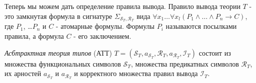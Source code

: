 \documentclass{amsart}
\theoremstyle{definition}
\theoremstyle{remark}
\numberwithin{figure}{section}
\begin{document}
Теперь мы можем дать определение правила вывода.
Правило вывода теории $T$ - это замкнутая формула в сигнатуре $\Sigma_{\mathcal{S}_T, \mathcal{R}_T}$ вида $\forall x_1 \ldots \forall x_l (P_1 \land \ldots \land P_n \to C)$, где $P_1$, \ldots $P_n$ и $C$ - атомарные формулы.
Формулы $P_i$ называются посылками правила, а формула $C$ - его заключением.

\begin{comment}
Пусть $Th$ - произвольная теория сигнатуры $\Sigma_{\mathcal{S}_T, \mathcal{R}_T}$.
Мы будем говорить, что посылка или заключение $P_i$ правила вывода $\forall x_1 \ldots \forall x_l (P_1 \land \ldots \land P_n \to P_{n+1})$ корректно в $Th$, если выполнено одно из следующих условий:
\begin{itemize}
\item $P_i = R(a_1, \ldots a_k)$ для некоторого $R \in \mathcal{R}_T$ и некоторых термов $a_1$, \ldots $a_k$.
\item $P_i = Tm_k(A_1, \ldots A_k, a, A_{k + 1})$ для некоторого $k \in \mathbb{N}$ и некоторых термов $A_1$, \ldots $A_{m + 1}$ и $a$ таких, что для любого $1 \leq j \leq m + 1$ в $Th$ выводима формула $P_1 \land \ldots \land P_{i - 1} \to Ty_{j - 1}(A_1, \ldots A_j)$.
    Кроме того, если $i \leq n$, то $a$ должен быть переменной, и если $i = n + 1$, то либо $a$ является переменной, либо $a = f(b_1, \ldots b_m)$ для некоторого $f \in \mathcal{S}_T$ такого, что $a_{\mathcal{S}_T}(f) = (s_1, \ldots s_m)$ и для всех $1 \leq j \leq m$ в $Th$ выводима либо формула $P_1 \land \ldots \land P_n \to Ty_{s_j}(d_1, \ldots d_{s_j}, b_j)$, либо формула $P_1 \land \ldots \land P_n \to Tm_{s_j}(d_1, \ldots d_{s_j}, b_j, d_{s_j + 1})$ для некоторых $d_1$, \ldots $d_{s_j + 1}$.
\item $P_i = Ty_k(A_1, \ldots A_k, a)$ для некоторого $k \in \mathbb{N}$ и некоторых термов $A_1$, \ldots $A_k$ и $a$ для которых выполнены условия из предыдущего пункта.
\end{itemize}

Мы будем говорить, что правило вывода корректно в $Th$, если все посылки и заключение корректно в $Th$.
Мы будем говорить, что множество правил вывода $\mathcal{I}$ корректно, если каждая правило вывода из $\mathcal{I}$ корректно в $Th_0 \cup \mathcal{I}$, где теория $Th_0$ состоит из следующих формул:
\end{comment}

\begin{defn}
    \emph{Асбтрактная теория типов} (АТТ) $T = (\mathcal{S}_T, a_{\mathcal{S}_T}, \mathcal{R}_T, a_{\mathcal{R}_T}, \mathcal{I}_T)$ состоит из множества функциональных символов $\mathcal{S}_T$, множества предикатных символов $\mathcal{R}_T$, их арностей $a_{\mathcal{S}_T}$ и $a_{\mathcal{R}_T}$ и корректного множества правил вывода $\mathcal{I}_T$.
\end{defn}
\end{document}
